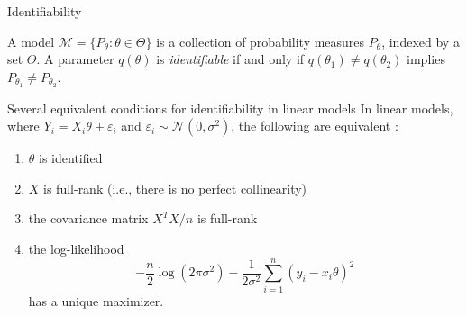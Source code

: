 \documentclass[aspectratio=169]{beamer}
\theoremstyle{remark}
\begin{document}
\appendix

\begin{frame}{Identifiability}
    \begin{definition}
        A model $\mathcal M = \{ P_\theta : \theta \in \Theta \}$ is a collection of probability measures $P_\theta$, indexed by a set $\Theta$. A parameter $q(\theta)$ is \emph{identifiable} if and only if $q(\theta_1) \neq q(\theta_2)$ implies $P_{\theta_1} \neq P_{\theta_2}$.
    \end{definition}
\end{frame}

\begin{frame}{Several equivalent conditions for identifiability in linear models}
    In linear models, where $Y_i = X_i \theta + \varepsilon_i$ and $\varepsilon_i \sim \mathcal N(0, \sigma^2)$, the following are equivalent \citep{lewbel2019}:
    \begin{enumerate}
        \item $\theta$ is identified
        \item $X$ is full-rank (i.e., there is no perfect collinearity)
        \item the covariance matrix $X^T X / n$ is full-rank
        \item the log-likelihood
              \[
                  -\frac{n}{2}\log(2\pi\sigma^2) - \frac{1}{2\sigma^2}\sum_{i=1}^n(y_i - x_i\theta)^2
              \]
              has a unique maximizer.
    \end{enumerate}
\end{frame}
\end{document}
